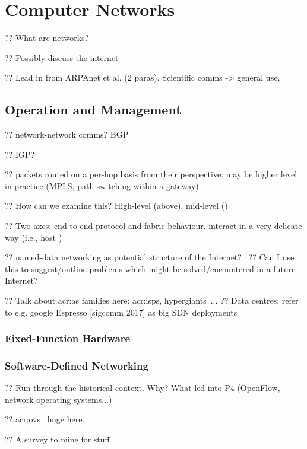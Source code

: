 \chapter{Computer Networks}\label{sec:ch-networks}\label{chap:nets}

?? What are networks?

?? Possibly discuss the internet

?? Lead in from ARPAnet et al. (2 paras). Scientific comms -> general use,

\section{Operation and Management}

?? network-network comms? BGP

?? IGP?

?? packets routed on a per-hop basis from their perspective: may be higher level in practice (MPLS, path switching within a gateway)

?? How can we examine this? High-level (above), mid-level ()

?? Two axes: end-to-end protocol and fabric behaviour. interact in a very delicate way (i.e., host )

?? named-data networking as potential structure of the Internet?~\parencite{DBLP:journals/ccr/0001ABJcCPWZ14}
?? Can I use this to suggest/outline problems which might be solved/encountered in a future Internet?

?? Talk about \gls{acr:as} families here: \glspl{acr:isp}, hypergiants~\parencite{DBLP:conf/sigcomm/GigisCMNKDKS21}...
?? Data centres: refer to e.g. google Espresso [sigcomm 2017] as big SDN deployments

\subsection{Fixed-Function Hardware}

\subsection{Software-Defined Networking}

?? Run through the historical context. Why? What led into P4 (OpenFlow, network operating systems...)

?? \gls{acr:ovs}~\parencite{DBLP:conf/nsdi/PfaffPKJZRGWSSA15} huge here.

?? A survey to mine for stuff~\parencite{DBLP:journals/comsur/NunesMNOT14}


